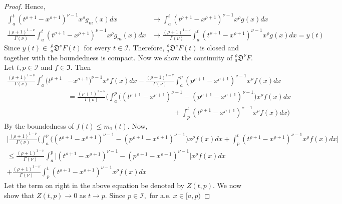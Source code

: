 \documentclass{amsproc}
\theoremstyle{definition}
\theoremstyle{remark}
\numberwithin{equation}{section}
\begin{document}
\begin{proof}
Hence,
\begin{equation*}
    \begin{aligned}
 \int_a^t(t^{\rho+1}-x^{\rho+1})^{\nu-1}x^{\rho}g_m(x)dx &\to \int_a^t(t^{\rho+1}-x^{\rho+1})^{\nu-1}x^{\rho}g(x)dx \\
 \frac{(\rho+1)^{1-\nu}}{\Gamma(\nu)}\int_a^t(t^{\rho+1}-x^{\rho+1})^{\nu-1}x^{\rho}g_m(x)dx & \to \frac{(\rho+1)^{1-\nu}}{\Gamma(\nu)}\int_a^t(t^{\rho+1}-x^{\rho+1})^{\nu-1}x^{\rho}g(x)dx =y(t)
  \end{aligned}
\end{equation*}
Since $y(t) \in ~_a^\rho\mathfrak{D}^\nu F(t)$ for every $t\in \mathcal{I}$. Therefore, $_a^\rho\mathfrak{D}^\nu F(t)$ is closed and together with the boundedness is compact. Now we show the continuity of $_a^\rho\mathfrak{D}^\nu F.$ Let $t,p \in \mathcal{I}$ and $f \in \mathfrak{I}.$ Then  
\begin{equation*}
    \begin{aligned}
\frac{(\rho+1)^{1-\nu}}{\Gamma(\nu)}\int_a^t(t^{\rho+1}&-x^{\rho+1})^{\nu-1}x^{\rho}f(x)dx-\frac{(\rho+1)^{1-\nu}}{\Gamma(\nu)}\int_a^p(p^{\rho+1}-x^{\rho+1})^{\nu-1}x^{\rho}f(x)dx \\ &=\frac{(\rho+1)^{1-\nu}}{\Gamma(\nu)}\bigg( \int_a^p\big((t^{\rho+1}-x^{\rho+1})^{\nu-1}-(p^{\rho+1}-x^{\rho+1})^{\nu-1}\big)x^{\rho}f(x)dx \\ & \hspace{15em} + \int_p^t(t^{\rho+1}-x^{\rho+1})^{\nu-1}x^{\rho}f(x)dx\bigg)
   \end{aligned}
\end{equation*}
By the boundedness of $f(t)\le m_1(t).$ Now,
\begin{equation*}
    \begin{aligned}
        \bigg| \frac{(\rho+1)^{1-\nu}}{\Gamma(\nu)}\bigg( \int_a^p\big((t^{\rho+1}-x^{\rho+1})^{\nu-1}-(p^{\rho+1}-x^{\rho+1})^{\nu-1}\big)x^{\rho}f(x)dx  + \int_p^t(t^{\rho+1}-x^{\rho+1})^{\nu-1}x^{\rho}f(x)dx \bigg| \\ \le \frac{(\rho+1)^{1-\nu}}{\Gamma(\nu)} \int_a^p\big|(t^{\rho+1}-x^{\rho+1})^{\nu-1}-(p^{\rho+1}-x^{\rho+1})^{\nu-1}\big|x^{\rho}f(x)dx\\  + \frac{(\rho+1)^{1-\nu}}{\Gamma(\nu)}\int_p^t(t^{\rho+1}-x^{\rho+1})^{\nu-1}x^{\rho}f(x)dx 
    \end{aligned}
\end{equation*}
Let the term on right in the above equation be denoted by $ Z(t,p).$ We now show that $Z(t,p)\to 0$ as $t\to p.$ Since $p \in \mathcal{I},$ for a.e. $x \in [a,p)$ 

\end{proof}
\end{document}
